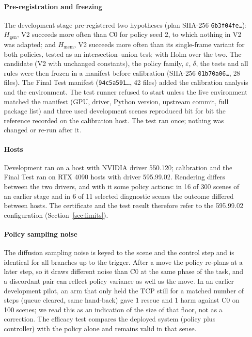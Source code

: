 \paragraph{Pre-registration and freezing} The development stage pre-registered two hypotheses (plan SHA-256 \texttt{6b3f04fe\ldots}): $H_{\mathrm{gen}}$, V2 succeeds more often than C0 for policy seed 2, to which nothing in V2 was adapted; and $H_{\mathrm{mem}}$, V2 succeeds more often than its single-frame variant for both policies, tested as an intersection--union test; with Holm over the two. The candidate (V2 with unchanged constants), the policy family, $\varepsilon$, $\delta$, the tests and all rules were then frozen in a manifest before calibration (SHA-256 \texttt{01b70a06\ldots}, 28 files). The Final Test manifest (\texttt{94c5a591\ldots}, 42 files) added the calibration analysis and the environment. The test runner refused to start unless the live environment matched the manifest (GPU, driver, Python version, upstream commit, full package list) and three used development scenes reproduced bit for bit the reference recorded on the calibration host. The test ran once; nothing was changed or re-run after it.

\paragraph{Hosts} Development ran on a host with NVIDIA driver 550.120; calibration and the Final Test ran on RTX 4090 hosts with driver 595.99.02. Rendering differs between the two drivers, and with it some policy actions: in 16 of 300 scenes of an earlier stage and in 6 of 11 selected diagnostic scenes the outcome differed between hosts. The certificate and the test result therefore refer to the 595.99.02 configuration (Section~\ref{sec:limits}).

\paragraph{Policy sampling noise} The diffusion sampling noise is keyed to the scene and the control step and is identical for all branches up to the trigger. After a move the policy re-plans at a later step, so it draws different noise than C0 at the same phase of the task, and a discordant pair can reflect policy variance as well as the move. In an earlier development pilot, an arm that only held the TCP still for a matched number of steps (queue cleared, same hand-back) gave 1 rescue and 1 harm against C0 on 100 scenes; we read this as an indication of the size of that floor, not as a correction. The efficacy test compares the deployed system (policy plus controller) with the policy alone and remains valid in that sense.


